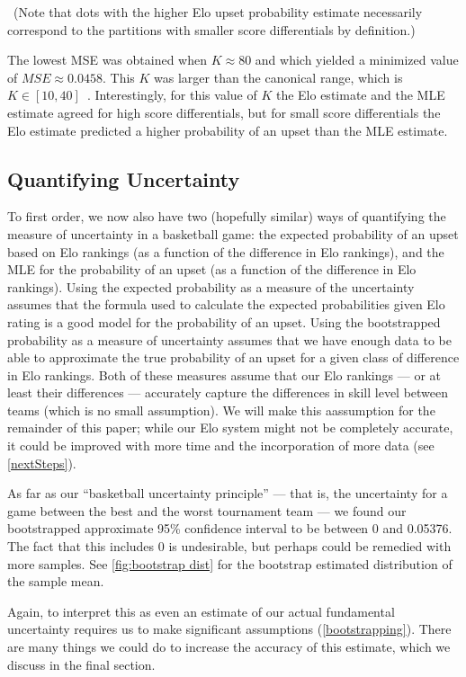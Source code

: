 \documentclass{article}
\begin{document}
\
(Note that dots with the higher Elo upset probability estimate necessarily correspond to the partitions with smaller score differentials by definition.)

The lowest MSE was obtained when $K\approx80$ and which yielded a minimized value of $MSE\approx0.0458$. This $K$ was larger than the canonical range, which is $K \in[10, 40]$~\cite{mediumRatingSystem}. Interestingly, for this value of $K$ the Elo estimate and the MLE estimate agreed for high score differentials, but for small score differentials the Elo estimate predicted a higher probability of an upset than the MLE estimate. 

\subsection{Quantifying Uncertainty}
To first order, we now also have two (hopefully similar) ways of quantifying the measure of uncertainty in a basketball game: the expected probability of an upset based on Elo rankings (as a function of the difference in Elo rankings), and the MLE for the probability of an upset (as a function of the difference in Elo rankings). Using the expected probability as a measure of the uncertainty assumes that the formula used to calculate the expected probabilities given Elo rating is a good model for the probability of an upset. Using the bootstrapped probability as a measure of uncertainty assumes that we have enough data to be able to approximate the true probability of an upset for a given class of difference in Elo rankings. Both of these measures assume that our Elo rankings --- or at least their differences --- accurately capture the differences in skill level between teams (which is no small assumption). We will make this aassumption for the remainder of this paper; while our Elo system might not be completely accurate, it could be improved with more time and the incorporation of more data (see \autoref{nextSteps}).

As far as our ``basketball uncertainty principle'' --- that is, the uncertainty for a game between the best and the worst tournament team --- we found our bootstrapped approximate 95\% confidence interval to be between 0 and 0.05376. The fact that this includes 0 is undesirable, but perhaps could be remedied with more samples. See \autoref{fig:bootstrap dist} for the bootstrap estimated distribution of the sample mean.

Again, to interpret this as even an estimate of our actual fundamental uncertainty requires us to make significant assumptions (\autoref{bootstrapping}). There are many things we could do to increase the accuracy of this estimate, which we discuss in the final section. 
\end{document}
